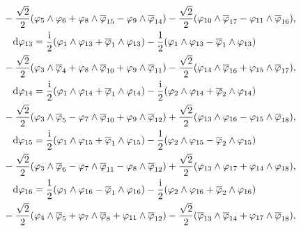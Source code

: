 \documentclass[10pt,a4paper]{amsart}
\numberwithin{equation}{section}
\begin{document}
\begin{Example}
\begin{gather*}
\hphantom{{\rm d} \varphi_{18} =}{} - \frac{\sqrt{2}}{2} (\varphi_5 \wedge \varphi_6 + \varphi_8 \wedge \overline \varphi_{15} - \varphi_9 \wedge \overline \varphi_{14} ) - \frac{\sqrt{2}}{2} (\varphi_{10} \wedge \overline \varphi_{17} - \varphi_{11} \wedge \overline \varphi_{16}),\\
{\rm d} \varphi_{13} = \frac{{\rm i}}{2} (\varphi_1\wedge \varphi_{13} + \overline \varphi_1 \wedge \varphi_{13}) - \frac{1}{2} (\varphi_1 \wedge \varphi_{13} - \overline \varphi_1 \wedge \varphi_{13})\\
\hphantom{{\rm d} \varphi_{18} =}{} - \frac{\sqrt{2}}{2} (\varphi_3 \wedge \overline \varphi_4 + \varphi_8 \wedge \overline \varphi_{10} + \varphi_9 \wedge \overline \varphi_{11} ) - \frac{\sqrt{2}}{2} (\varphi_{14} \wedge \overline \varphi_{16} + \varphi_{15} \wedge \overline \varphi_{17}),
\\
{\rm d} \varphi_{14} = \frac{{\rm i}}{2} (\varphi_1 \wedge \varphi_{14} + \overline \varphi_1 \wedge \varphi_{14})- \frac{{\rm i}}{2} (\varphi_2 \wedge \varphi_{14} +\overline \varphi_2 \wedge \varphi_{14}) \\
\hphantom{{\rm d} \varphi_{18} =}{} - \frac{\sqrt{2}}{2} (\varphi_3 \wedge \overline \varphi_5 - \varphi_7 \wedge \overline \varphi_{10} + \varphi_9 \wedge \overline \varphi_{12} ) +\frac{\sqrt{2}}{2} (\varphi_{13} \wedge \varphi_{16} - \varphi_{15} \wedge \overline \varphi_{18}),\\
{\rm d} \varphi_{15} = \frac{{\rm i}}{2} (\varphi_1 \wedge \varphi_{15} + \overline \varphi_1 \wedge \varphi_{15}) - \frac{1}{2} (\varphi_2 \wedge \varphi_{15} - \overline \varphi_2 \wedge \varphi_{15})\\
\hphantom{{\rm d} \varphi_{18} =}{} - \frac{\sqrt{2}}{2} (\varphi_3 \wedge \overline \varphi_6 - \varphi_7 \wedge \overline \varphi_{11} - \varphi_8 \wedge \overline \varphi_{12} ) + \frac{\sqrt{2}}{2} (\varphi_{13} \wedge \varphi_{17} + \varphi_{14} \wedge \varphi_{18}),\\
{\rm d} \varphi_{16} = \frac{1}{2} (\varphi_1 \wedge \varphi_{16} - \overline \varphi_1 \wedge \varphi_{16}) - \frac{{\rm i}}{2} (\varphi_2 \wedge \varphi_{16} + \overline \varphi_2 \wedge \varphi_{16})\\
\hphantom{{\rm d} \varphi_{18} =}{} - \frac{\sqrt{2}}{2} (\varphi_4 \wedge \overline \varphi_5 + \varphi_7 \wedge \overline \varphi_{8} + \varphi_{11} \wedge \overline \varphi_{12} ) - \frac{\sqrt{2}}{2} ( \overline \varphi_{13} \wedge \overline \varphi_{14} + \varphi_{17} \wedge \overline \varphi_{18}),\\

\end{gather*}
\end{Example}
\end{document}
